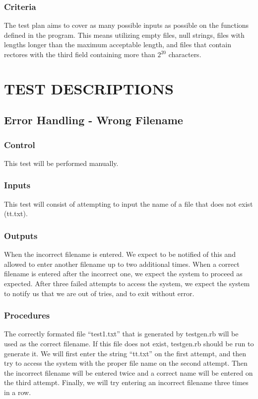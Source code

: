\documentclass[]{article}
\begin{document}
	\subsubsection{Criteria}
	The test plan aims to cover as many possible inputs as possible on the
	functions defined in the program.  This means utilizing empty files, null
	strings, files with lengths longer than the maximum acceptable length, and
	files that contain rectores with the third field containing more than $2^{20}$
	characters.
	


\section{TEST DESCRIPTIONS}

\subsection{Error Handling - Wrong Filename}
	\subsubsection{Control}
	This test will be performed manually.
	
	\subsubsection{Inputs}
	This test will consist of attempting to input the name of a file that does not
	exist (tt.txt).
	
	\subsubsection{Outputs}
	When the incorrect filename is entered.  We expect to be notified of this and
	allowed to enter another filename up to two additional times.  When a correct
	filename is entered after the incorrect one, we expect the system to proceed as
	expected.  After three failed attempts to access the system, we expect the
	system to notify us that we are out of tries, and to exit without error.
	
	\subsubsection{Procedures}
	The correctly formated file ``test1.txt'' that is generated by testgen.rb will
	be used as the correct filename.  If this file does not exist, testgen.rb
	should be run to generate it. We will first enter the string ``tt.txt'' on the
	first attempt, and then try to access the system with the proper file name on
	the second attempt. Then the incorrect filename will be entered twice and a
	correct name will be entered on the third attempt. Finally, we will try
	entering an incorrect filename three times in a row.
	
\end{document}
